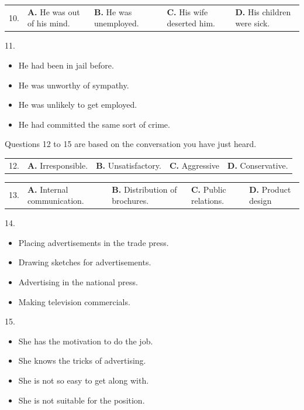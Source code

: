 \documentclass[UTF8,11pt]{ctexart}
\begin{document}
\noindent\begin{tabularx}{\linewidth}{@{}lXXXX@{}}10. & \textbf{A.} He was out of his mind. & \textbf{B.} He was unemployed. & \textbf{C.} His wife deserted him. & \textbf{D.} His children were sick.\\\end{tabularx}\par

11.


\begin{itemize}[leftmargin=2em,itemsep=.2em,topsep=.4em]\item[A.] He had been in jail before.
\item[B.] He was unworthy of sympathy.
\item[C.] He was unlikely to get employed.
\item[D.] He had committed the same sort of crime.
\end{itemize}

Questions 12 to 15 are based on the conversation you have just heard.


\noindent\begin{tabularx}{\linewidth}{@{}lXXXX@{}}12. & \textbf{A.} Irresponsible. & \textbf{B.} Unsatisfactory. & \textbf{C.} Aggressive & \textbf{D.} Conservative.\\\end{tabularx}\par

\noindent\begin{tabularx}{\linewidth}{@{}lXXXX@{}}13. & \textbf{A.} Internal communication. & \textbf{B.} Distribution of brochures. & \textbf{C.} Public relations. & \textbf{D.} Product design\\\end{tabularx}\par

14.


\begin{itemize}[leftmargin=2em,itemsep=.2em,topsep=.4em]\item[A.] Placing advertisements in the trade press.
\item[B.] Drawing sketches for advertisements.
\item[C.] Advertising in the national press.
\item[D.] Making television commercials.
\end{itemize}

15.


\begin{itemize}[leftmargin=2em,itemsep=.2em,topsep=.4em]\item[A.] She has the motivation to do the job.
\item[B.] She knows the tricks of advertising.
\item[C.] She is not so easy to get along with.
\item[D.] She is not suitable for the position.
\end{itemize}
\end{document}
